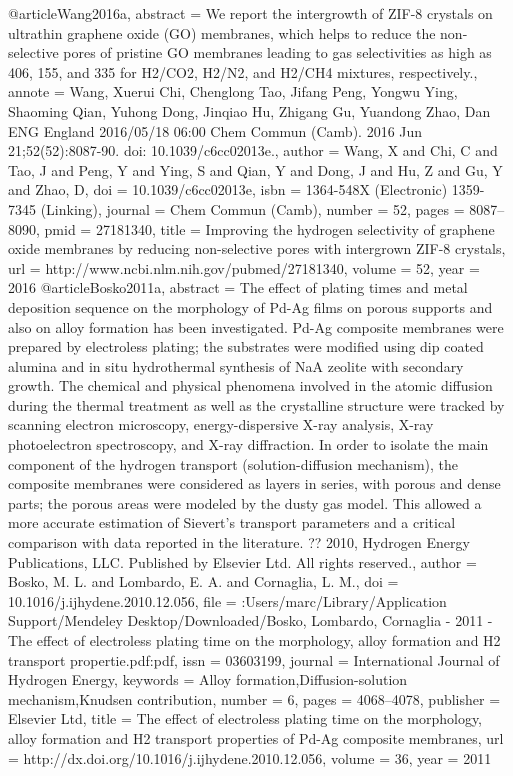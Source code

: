 @article{Wang2016a,
abstract = {We report the intergrowth of ZIF-8 crystals on ultrathin graphene oxide (GO) membranes, which helps to reduce the non-selective pores of pristine GO membranes leading to gas selectivities as high as 406, 155, and 335 for H2/CO2, H2/N2, and H2/CH4 mixtures, respectively.},
annote = {Wang, Xuerui
Chi, Chenglong
Tao, Jifang
Peng, Yongwu
Ying, Shaoming
Qian, Yuhong
Dong, Jinqiao
Hu, Zhigang
Gu, Yuandong
Zhao, Dan
ENG
England
2016/05/18 06:00
Chem Commun (Camb). 2016 Jun 21;52(52):8087-90. doi: 10.1039/c6cc02013e.},
author = {Wang, X and Chi, C and Tao, J and Peng, Y and Ying, S and Qian, Y and Dong, J and Hu, Z and Gu, Y and Zhao, D},
doi = {10.1039/c6cc02013e},
isbn = {1364-548X (Electronic)
1359-7345 (Linking)},
journal = {Chem Commun (Camb)},
number = {52},
pages = {8087--8090},
pmid = {27181340},
title = {{Improving the hydrogen selectivity of graphene oxide membranes by reducing non-selective pores with intergrown ZIF-8 crystals}},
url = {http://www.ncbi.nlm.nih.gov/pubmed/27181340},
volume = {52},
year = {2016}
}
@article{Bosko2011a,
abstract = {The effect of plating times and metal deposition sequence on the morphology of Pd-Ag films on porous supports and also on alloy formation has been investigated. Pd-Ag composite membranes were prepared by electroless plating; the substrates were modified using dip coated alumina and in situ hydrothermal synthesis of NaA zeolite with secondary growth. The chemical and physical phenomena involved in the atomic diffusion during the thermal treatment as well as the crystalline structure were tracked by scanning electron microscopy, energy-dispersive X-ray analysis, X-ray photoelectron spectroscopy, and X-ray diffraction. In order to isolate the main component of the hydrogen transport (solution-diffusion mechanism), the composite membranes were considered as layers in series, with porous and dense parts; the porous areas were modeled by the dusty gas model. This allowed a more accurate estimation of Sievert's transport parameters and a critical comparison with data reported in the literature. ?? 2010, Hydrogen Energy Publications, LLC. Published by Elsevier Ltd. All rights reserved.},
author = {Bosko, M. L. and Lombardo, E. A. and Cornaglia, L. M.},
doi = {10.1016/j.ijhydene.2010.12.056},
file = {:Users/marc/Library/Application Support/Mendeley Desktop/Downloaded/Bosko, Lombardo, Cornaglia - 2011 - The effect of electroless plating time on the morphology, alloy formation and H2 transport propertie.pdf:pdf},
issn = {03603199},
journal = {International Journal of Hydrogen Energy},
keywords = {Alloy formation,Diffusion-solution mechanism,Knudsen contribution},
number = {6},
pages = {4068--4078},
publisher = {Elsevier Ltd},
title = {{The effect of electroless plating time on the morphology, alloy formation and H2 transport properties of Pd-Ag composite membranes}},
url = {http://dx.doi.org/10.1016/j.ijhydene.2010.12.056},
volume = {36},
year = {2011}
}

